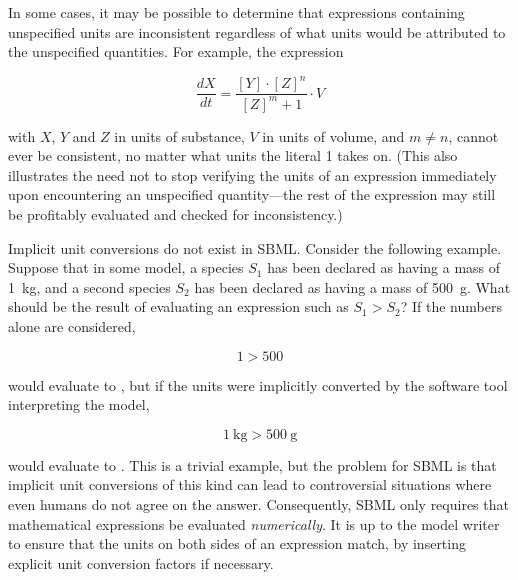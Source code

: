 In some cases, it may be possible to determine that expressions
containing unspecified units are inconsistent regardless of what
units would be attributed to the unspecified quantities.  For
example, the expression
\begin{linenomath}
  \begin{equation*}
    \frac{dX}{dt} = \frac{[Y] \cdot [Z]^n}{[Z]^m + 1} \cdot V
  \end{equation*}
\end{linenomath}
with $X$, $Y$ and $Z$ in units of substance, $V$ in
units of volume, and $m \neq n$, cannot ever be consistent, no
matter what units the literal 1 takes on.  (This also illustrates
the need not to stop verifying the units of an expression
immediately upon encountering an unspecified quantity---the rest
of the expression may still be profitably evaluated and checked
for inconsistency.)


\label{sec:no-implicit-conversions}

Implicit unit conversions do not exist in SBML.  Consider the
following example.  Suppose that in some model, a species $S_1$
has been declared as having a mass of 1~kg, and a second species
$S_2$ has been declared as having a mass of 500~g.  What should be
the result of evaluating an expression such as $S_1 > S_2$?  If
the numbers alone are considered,
\begin{linenomath}
  \begin{equation*}
    1 > 500
  \end{equation*}
\end{linenomath}
would evaluate to , but if the units were implicitly
converted by the software tool interpreting the model,
\begin{linenomath}
  \begin{equation*}
    1~\mathrm{kg} > 500~\mathrm{g}
  \end{equation*}
\end{linenomath}
would evaluate to .  This is a trivial example, but the
problem for SBML is that implicit unit conversions of this kind
can lead to controversial situations where even humans do not
agree on the answer.  Consequently, SBML only requires that
mathematical expressions be evaluated \emph{numerically}.  It is
up to the model writer to ensure that the units on both sides of
an expression match, by inserting explicit unit conversion factors
if necessary.
